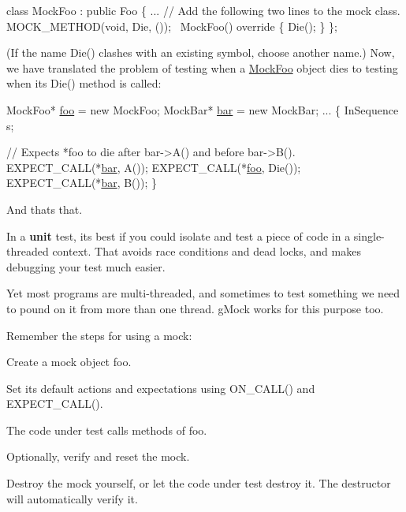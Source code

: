 \begin{DoxyCode}
\textcolor{keyword}{class }MockFoo : \textcolor{keyword}{public} Foo \{
  ...
  \textcolor{comment}{// Add the following two lines to the mock class.}
  MOCK\_METHOD(\textcolor{keywordtype}{void}, Die, ());
  ~MockFoo()\textcolor{keyword}{ override }\{ Die(); \}
\};
\end{DoxyCode}


(If the name {\ttfamily Die()} clashes with an existing symbol, choose another name.) Now, we have translated the problem of testing when a {\ttfamily \mbox{\hyperlink{classMockFoo}{Mock\+Foo}}} object dies to testing when its {\ttfamily Die()} method is called\+:


\begin{DoxyCode}
MockFoo* \mbox{\hyperlink{namespacefoo}{foo}} = \textcolor{keyword}{new} MockFoo;
MockBar* \mbox{\hyperlink{namespacebar}{bar}} = \textcolor{keyword}{new} MockBar;
...
\{
  InSequence s;

  \textcolor{comment}{// Expects *foo to die after bar->A() and before bar->B().}
  EXPECT\_CALL(*\mbox{\hyperlink{namespacebar}{bar}}, A());
  EXPECT\_CALL(*\mbox{\hyperlink{namespacefoo}{foo}}, Die());
  EXPECT\_CALL(*\mbox{\hyperlink{namespacebar}{bar}}, B());
\}
\end{DoxyCode}


And that\textquotesingle{}s that.

In a {\bfseries unit} test, it\textquotesingle{}s best if you could isolate and test a piece of code in a single-\/threaded context. That avoids race conditions and dead locks, and makes debugging your test much easier.

Yet most programs are multi-\/threaded, and sometimes to test something we need to pound on it from more than one thread. g\+Mock works for this purpose too.

Remember the steps for using a mock\+:


\begin{DoxyEnumerate}
\item Create a mock object {\ttfamily foo}.
\item Set its default actions and expectations using {\ttfamily O\+N\+\_\+\+C\+A\+L\+L()} and {\ttfamily E\+X\+P\+E\+C\+T\+\_\+\+C\+A\+L\+L()}.
\item The code under test calls methods of {\ttfamily foo}.
\item Optionally, verify and reset the mock.
\item Destroy the mock yourself, or let the code under test destroy it. The destructor will automatically verify it.
\end{DoxyEnumerate}

